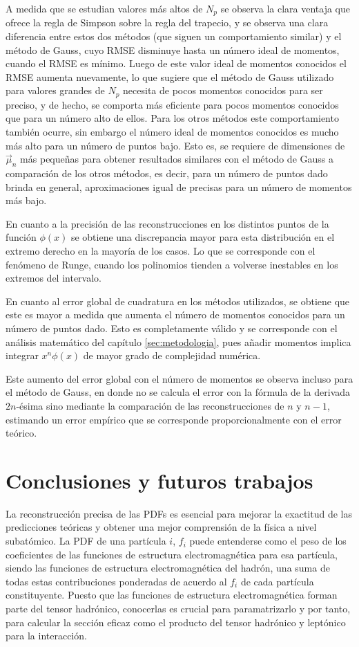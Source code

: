 \documentclass[titlepage,11pt]{report}
\begin{document}
A medida que se estudian valores más altos de $N_p$ se observa la clara ventaja que ofrece la regla de Simpson sobre la regla del trapecio, y se observa una clara diferencia entre estos dos métodos (que siguen un comportamiento similar) y el método de Gauss, cuyo RMSE disminuye hasta un número ideal de momentos, cuando el RMSE es mínimo. Luego de este valor ideal de momentos conocidos el RMSE aumenta nuevamente, lo que sugiere que el método de Gauss utilizado para valores grandes de $N_p$ necesita de pocos momentos conocidos para ser preciso, y de hecho, se comporta más eficiente para pocos momentos conocidos que para un número alto de ellos. Para los otros métodos este comportamiento también ocurre, sin embargo el número ideal de momentos conocidos es mucho más alto para un número de puntos bajo. Esto es, se requiere de dimensiones de $\vec{\mu}_n$ más pequeñas para obtener resultados similares con el método de Gauss a comparación de los otros métodos, es decir, para un número de puntos dado brinda en general, aproximaciones igual de precisas para un número de momentos más bajo.

En cuanto a la precisión de las reconstrucciones en los distintos puntos de la función $\phi(x)$ se obtiene una discrepancia mayor para esta distribución en el extremo derecho en la mayoría de los casos. Lo que se corresponde con el fenómeno de Runge, cuando los polinomios tienden a volverse inestables en los extremos del intervalo.  

En cuanto al error global de cuadratura en los métodos utilizados, se obtiene que este es mayor a medida que aumenta el número de momentos conocidos para un número de puntos dado. Esto es completamente válido y se corresponde con el análisis matemático del capítulo \ref{sec:metodologia}, pues añadir momentos implica integrar $x^n\phi(x)$ de mayor grado de complejidad numérica.

Este aumento del error global con el número de momentos se observa incluso para el método de Gauss, en donde no se calcula el error con la fórmula de la derivada $2n$-ésima sino mediante la comparación de las reconstrucciones de $n$ y $n-1$, estimando un error empírico que se corresponde proporcionalmente con el error teórico.


\chapter{Conclusiones y futuros trabajos}
\label{sec:conclusiones}

La reconstrucción precisa de las PDFs es esencial para mejorar la exactitud de las predicciones teóricas y obtener una mejor comprensión de la física a nivel subatómico. La PDF de una partícula $i$, $f_i$ puede entenderse como el peso de los coeficientes de las funciones de estructura electromagnética para esa partícula, siendo las funciones de estructura electromagnética del hadrón, una suma de todas estas contribuciones ponderadas de acuerdo al $f_i$ de cada partícula constituyente. Puesto que las funciones de estructura electromagnética forman parte del tensor hadrónico, conocerlas es crucial para paramatrizarlo y por tanto, para calcular la sección eficaz como el producto del tensor hadrónico y leptónico para la interacción. 
\end{document}
